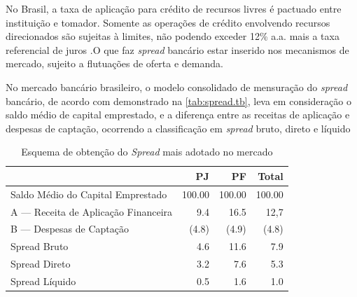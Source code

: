 \documentclass[
  12pt,
  12pt,
  openright,
  oneside,
  a4paper,
  chapter=TITLE,
  section=TITLE,
  subsection=TITLE,
  subsubsection=TITLE,
  english,
  portugues,
  sumario=tradicional]{abntex2}
\begin{document}
No Brasil, a taxa de aplicação para crédito de recursos livres é pactuado entre instituição e tomador. Somente as operações de crédito envolvendo recursos direcionados são sujeitas à limites, não podendo exceder 12\% a.a. mais a taxa referencial de juros \cite{BCB:2016}.O que faz \emph{spread} bancário estar inserido nos mecanismos de mercado, sujeito a flutuações de oferta e demanda.

No mercado bancário brasileiro, o modelo consolidado de mensuração do \emph{spread} bancário, de acordo com demonstrado na \autoref{tab:spread.tb}, leva em consideração o saldo médio de capital emprestado, e a diferença entre as receitas de aplicação e despesas de captação, ocorrendo a classificação em \emph{spread} bruto, direto e líquido \cite{fipecafi:2005}

\begin{table}[!htbp]
\vspace{20pt}
 \centering
   \caption{Esquema de obtenção do \emph{Spread} mais adotado no mercado} 
   \vspace{1mm}
    \label{tab:spread.tb}
     \begin{tabular}{l|r|r|r}
      \hline
                                           &   PJ   &   PF    & Total \\
       \hline
       Saldo Médio do Capital Emprestado   & 100.00 & 100.00  & 100.00 \\
       A — Receita de Aplicação Financeira & 9.4    & 16.5    & 12,7   \\
       B — Despesas de Captação            & (4.8)  & (4.9)   & (4.8)  \\   
       Spread Bruto                        & 4.6    & 11.6    & 7.9    \\
       Spread Direto                       & 3.2    & 7.6     & 5.3    \\
       Spread Líquido                      & 0.5    & 1.6     & 1.0    \\
       \hline
       \end{tabular}
\vspace{1mm}
\vspace{-2mm}
\end{table}
\end{document}
